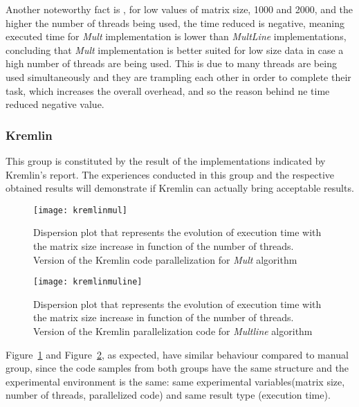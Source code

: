 Another noteworthy fact is , for low values of matrix size, 1000 and 2000, and the higher the number of threads being used, the time reduced is negative, meaning executed time for \textit{Mult} implementation is lower than \textit{MultLine} implementations, concluding that  \textit{Mult} implementation is better suited for low size data in case a high number of threads are being used. This is due to many threads are being used simultaneously and they are trampling each other in order to complete their task, which increases the overall overhead, and so the reason behind ne time reduced negative value.


\subsubsection{Kremlin}

This group is constituted by the result of the implementations indicated by Kremlin's report. The experiences conducted in this group and the respective obtained results will demonstrate if Kremlin can actually bring acceptable results. 

\begin{figure}[htb]
	\begin{center}
		\leavevmode
		\texttt{[image: kremlinmul]}
		\caption{Dispersion plot that represents the evolution of execution time with the matrix size increase in function of the number of threads. Version of the Kremlin code parallelization for \textsl{Mult} algorithm}
		\label{fig:kremlinmul}
	\end{center}
\end{figure}

\begin{figure}[htb]
	\begin{center}
		\leavevmode
		\texttt{[image: kremlinmuline]}
		\caption{Dispersion plot that represents the evolution of execution time with the matrix size increase in function of the number of threads. Version of the Kremlin parallelization code for \textsl{Multline} algorithm}
		\label{fig:kremlinmuline}
	\end{center}
\end{figure}

Figure~\ref{fig:kremlinmul} and Figure~\ref{fig:kremlinmuline}, as expected, have similar behaviour compared to manual group, since the code samples from both groups have the same structure and the experimental environment is the same: same experimental variables(matrix size, number of threads, parallelized code) and same result type (execution time).


